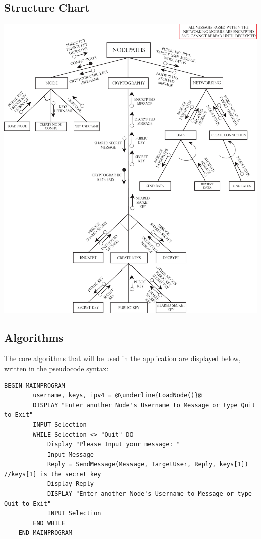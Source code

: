 \documentclass[a4paper, titlepage]{article}
\begin{document}
\subsection{Structure Chart}
\includegraphics[width=1\textwidth]{structure_chart.png}\par

\subsection{Algorithms}

\renewcommand{\ttdefault}{pcr}

The core algorithms that will be used in the application are displayed below, written in the pseudocode syntax:

\begin{lstlisting}[caption=Main Program, escapechar=\@]
	BEGIN MAINPROGRAM
		username, keys, ipv4 = @\underline{LoadNode()}@
		DISPLAY "Enter another Node's Username to Message or type Quit to Exit"
		INPUT Selection
		WHILE Selection <> "Quit" DO
			Display "Please Input your message: "
			Input Message 	
			Reply = SendMessage(Message, TargetUser, Reply, keys[1]) //keys[1] is the secret key
			Display Reply
			DISPLAY "Enter another Node's Username to Message or type Quit to Exit"
			INPUT Selection
		END WHILE
	END MAINPROGRAM
\end{lstlisting}
\end{document}
